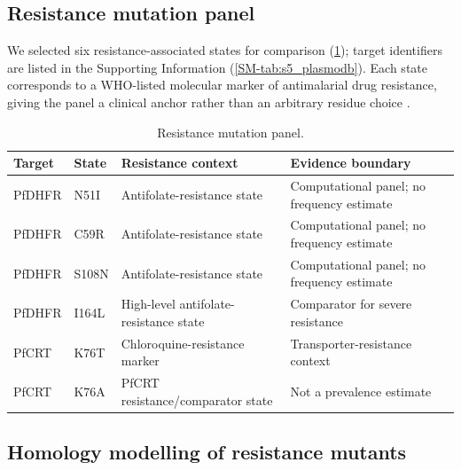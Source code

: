 \documentclass[journal=jcisd8,manuscript=article,layout=traditional]{achemso}
\begin{document}
\subsection{Resistance mutation panel}

We selected six resistance-associated states for comparison (\cref{tab:mutations}); target identifiers are listed in the Supporting Information (\cref{SM-tab:s5_plasmodb}). Each state corresponds to a WHO-listed molecular marker of antimalarial drug resistance, giving the panel a clinical anchor rather than an arbitrary residue choice \citep{who_compendium_markers}.

\begin{table}[htbp]
\centering
\caption{Resistance mutation panel.}
\label{tab:mutations}
\begin{tabularx}{\textwidth}{l l l X}
\toprule
Target & State & Resistance context & Evidence boundary \\
\midrule
PfDHFR & N51I & Antifolate-resistance state & Computational panel; no frequency estimate \\
PfDHFR & C59R & Antifolate-resistance state & Computational panel; no frequency estimate \\
PfDHFR & S108N & Antifolate-resistance state & Computational panel; no frequency estimate \\
PfDHFR & I164L & High-level antifolate-resistance state & Comparator for severe resistance \\
PfCRT & K76T & Chloroquine-resistance marker & Transporter-resistance context \\
PfCRT & K76A & PfCRT resistance/comparator state & Not a prevalence estimate \\
\bottomrule
\end{tabularx}
\end{table}

\subsection{Homology modelling of resistance mutants}
\end{document}

